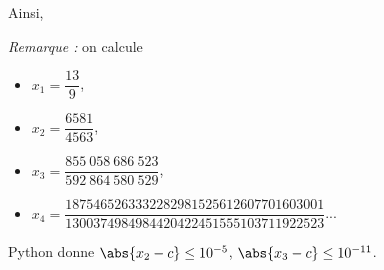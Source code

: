 \begin{enumerate}
\begin{enumerate}
            Ainsi, 
    \end{enumerate}
    \emph{Remarque :} on calcule 
        \begin{itemize}
            \item $x_1 = \dfrac{13}{9}$,\vspace{.2cm}
            \item $x_2 = \dfrac{6581}{4563}$,\vspace{.2cm}
            \item $x_3 = \dfrac{855~058~686~523}{592~864~580~529}$,\vspace{.2cm}
            \item $x_4 = \dfrac{1875465263332282981525612607701603001}{1300374984984420422451555103711922523}$...\vspace{.2cm}
        \end{itemize}
    Python donne $\abs{x_2-c} \leq 10^{-5}$, $\abs{x_3-c} \leq 10^{-11}$. 
    
    
\end{enumerate}
